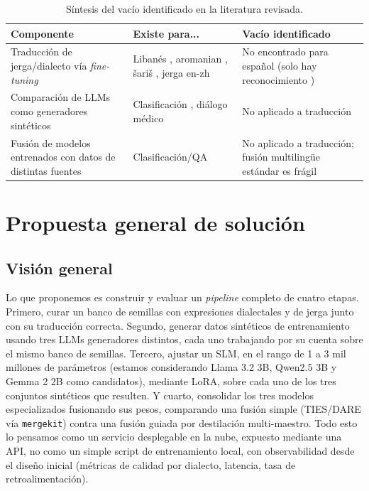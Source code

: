 \documentclass[11pt,a4paper]{article}
\begin{document}
\begin{table}[h]
\centering
\small
\begin{tabular}{p{4.3cm}p{4.3cm}p{4.3cm}}
\toprule
\textbf{Componente} & \textbf{Existe para...} & \textbf{Vacío identificado} \\
\midrule
Traducción de jerga/dialecto vía \textit{fine-tuning} & Libanés \cite{yakhni2025lebanese}, aromanian \cite{jerpelea2025aromanian}, šariš \cite{ondrejova2024saris}, jerga en-zh \cite{liang2025slangdit} & No encontrado para español (solo hay reconocimiento \cite{martinez2025spanish, zander2026register}) \\
\addlinespace
Comparación de LLMs como generadores sintéticos & Clasificación \cite{poliakov2025missynth}, diálogo médico \cite{allam2025arabic} & No aplicado a traducción \\
\addlinespace
Fusión de modelos entrenados con datos de distintas fuentes & Clasificación/QA \cite{tao2025mergemix} & No aplicado a traducción; fusión multilingüe estándar es frágil \cite{gain2026mountdoom} \\
\bottomrule
\end{tabular}
\caption{Síntesis del vacío identificado en la literatura revisada.}
\label{tab:gap}
\end{table}



\section{Propuesta general de solución}
\label{sec:propuesta}

\subsection{Visión general}

Lo que proponemos es construir y evaluar un \textit{pipeline} completo de cuatro etapas. Primero, curar un banco de semillas con expresiones dialectales y de jerga junto con su traducción correcta. Segundo, generar datos sintéticos de entrenamiento usando tres LLMs generadores distintos, cada uno trabajando por su cuenta sobre el mismo banco de semillas. Tercero, ajustar un SLM, en el rango de 1 a 3 mil millones de parámetros (estamos considerando Llama 3.2 3B, Qwen2.5 3B y Gemma 2 2B como candidatos), mediante LoRA, sobre cada uno de los tres conjuntos sintéticos que resulten. Y cuarto, consolidar los tres modelos especializados fusionando sus pesos, comparando una fusión simple (TIES/DARE vía \texttt{mergekit}) contra una fusión guiada por destilación multi-maestro. Todo esto lo pensamos como un servicio desplegable en la nube, expuesto mediante una API, no como un simple script de entrenamiento local, con observabilidad desde el diseño inicial (métricas de calidad por dialecto, latencia, tasa de retroalimentación).
\end{document}
